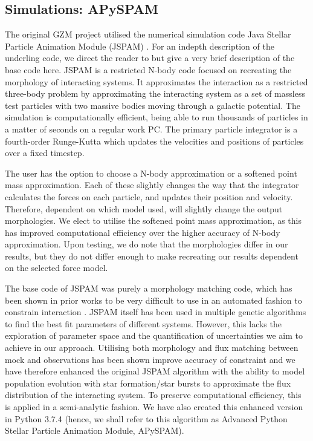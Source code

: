 \subsection{Simulations: APySPAM}
The original GZM project utilised the numerical simulation code Java Stellar Particle Animation Module (JSPAM) \citep{Wallin_16}. For an indepth description of the underling code, we direct the reader to \citet{Wallin_90,Wallin_16} but give a very brief description of the base code here. JSPAM is a restricted N-body code focused on recreating the morphology of interacting systems. It approximates the interaction as a restricted three-body problem by approximating the interacting system as a set of massless test particles with two massive bodies moving through a galactic potential. The simulation is computationally efficient, being able to run thousands of particles in a matter of seconds on a regular work PC. The primary particle integrator is a fourth-order Runge-Kutta which updates the velocities and positions of particles over a fixed timestep. 

The user has the option to choose a N-body approximation or a softened point mass approximation. Each of these slightly changes the way that the integrator calculates the forces on each particle, and updates their position and velocity. Therefore, dependent on which model used, will slightly change the output morphologies. We elect to utilise the softened point mass approximation, as this has improved computational efficiency over the higher accuracy of N-body approximation. Upon testing, we do note that the morphologies differ in our results, but they do not differ enough to make recreating our results dependent on the selected force model. 

The base code of JSPAM was purely a morphology matching code, which has been shown in prior works to be very difficult to use in an automated fashion to constrain interaction \citep[e.g.][]{Barnes_09}. JSPAM itself has been used in multiple genetic algorithms to find the best fit parameters of different systems. However, this lacks the exploration of parameter space and the quantification of uncertainties we aim to achieve in our approach. Utilising both morphology and flux matching between mock and observations has been shown improve accuracy of constraint \citep{Miller_21} and we have therefore enhanced the original JSPAM algorithm with the ability to model population evolution with star formation/star bursts to approximate the flux distribution of the interacting system. To preserve computational efficiency, this is applied in a semi-analytic fashion. We have also created this enhanced version in Python 3.7.4 (hence, we shall refer to this algorithm as Advanced Python Stellar Particle Animation Module, APySPAM).


